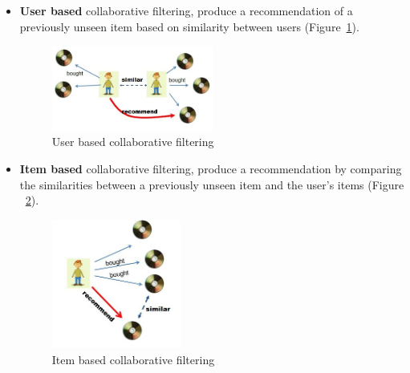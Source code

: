 \begin{itemize}
	\item \textbf{User based} collaborative filtering, produce a recommendation of a previously unseen item based on similarity between users (Figure~\ref{fig:userbasedcf}).

	\begin{figure}[h!]
		\centering
		\includegraphics[width=0.5\textwidth]{chapter2/user-user1.jpg}
		\caption{User based collaborative filtering \parencite{1_siddharths_blog_2013}}
		\label{fig:userbasedcf}
	\end{figure}
	
	\item \textbf{Item based} collaborative filtering, produce a recommendation by comparing the similarities between a previously unseen item and the user's items (Figure ~\ref{fig:itembasedcf}).
	
	\begin{figure}[ht!]
		\centering
		\includegraphics[width=0.4\textwidth]{chapter2/item-item1.jpg}
		\caption{Item based collaborative filtering \parencite{1_siddharths_blog_2013}}
		\label{fig:itembasedcf}
	\end{figure}
	
\end{itemize}

